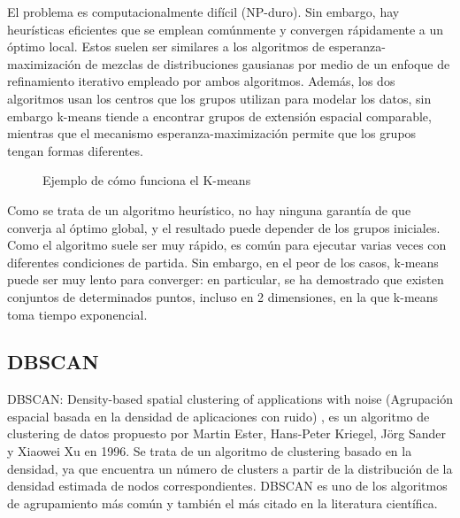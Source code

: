 El problema es computacionalmente difícil (NP-duro). Sin embargo, hay
heurísticas eficientes que se emplean comúnmente y convergen rápidamente a un
óptimo local. Estos suelen ser similares a los algoritmos de
esperanza-maximización de mezclas de distribuciones gausianas por medio de un
enfoque de refinamiento iterativo empleado por ambos algoritmos. Además, los dos
algoritmos usan los centros que los grupos utilizan para modelar los datos, sin
embargo k-means tiende a encontrar grupos de extensión espacial comparable,
mientras que el mecanismo esperanza-maximización permite que los grupos tengan
formas diferentes.

\begin{figure}[!htb]
\centering
{}
\caption{Ejemplo de cómo funciona el K-means}
\end{figure}

Como se trata de un algoritmo heurístico, no hay ninguna garantía de que
converja al óptimo global, y el resultado puede depender de los grupos
iniciales. Como el algoritmo suele ser muy rápido, es común para ejecutar
varias veces con diferentes condiciones de partida. Sin embargo, en el peor de
los casos, k-means puede ser muy lento para converger: en particular, se ha 
demostrado que existen conjuntos de determinados puntos, incluso en 2
dimensiones, en la que k-means toma tiempo exponencial.

\subsection{DBSCAN}

DBSCAN: Density-based spatial clustering of applications with noise (Agrupación
espacial basada en la densidad de aplicaciones con ruido) \cite{Ester:1996:SIC}, 
\cite{Wiki:2013:DBS} es un algoritmo de clustering de datos propuesto por Martin
Ester, Hans-Peter Kriegel, Jörg Sander y Xiaowei Xu en 1996. Se trata de un
algoritmo de clustering basado en la densidad, ya que encuentra un número de
clusters a partir de la distribución de la densidad estimada de nodos
correspondientes. DBSCAN es uno de los algoritmos de agrupamiento más común y
también el más citado en la literatura científica.


